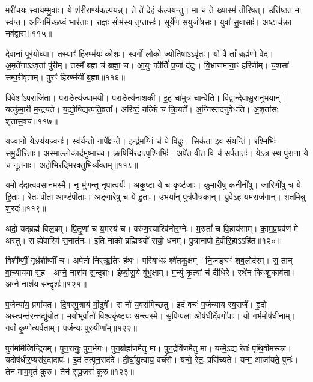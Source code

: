 मरी॑चयः स्वायम्भु॒वाः। ये श॑री॒राण्य॑कल्पयन्न्। 
ते ते॑ दे॒हं क॑ल्पयन्तु। मा च॑ ते॒ ख्यास्म॑ तीरिषत्। 
उत्ति॑ष्ठत॒ मा स्व॑प्त। अ॒ग्निमि॑च्छध्वं॒ भार॑ताः। 
राज्ञः॒ सोम॑स्य तृ॒प्तासः॑। सूर्ये॑ण स॒युजो॑षसः। 
युवा॑ सु॒वासाः᳚। अ॒ष्टाच॑क्रा॒ नव॑द्वारा॥११५॥


दे॒वानां॒ पूर॑यो॒ध्या। तस्याꣳ॑ हिरण्म॑यः को॒शः। 
स्व॒र्गो लो॒को ज्योति॒षाऽऽवृ॑तः। यो वै तां᳚ ब्रह्म॑णो वे॒द। 
अ॒मृते॑नाऽऽवृ॒तां पु॑रीम्। तस्मै᳚ ब्रह्म च॑ ब्रह्मा॒ च। 
आ॒युः कीर्तिं॑ प्र॒जां द॑दुः। वि॒भ्राज॑माना॒ꣳ॒ हरि॑णीम्। 
य॒शसा॑ सम्प॒रीवृ॑ताम्। पुरꣳ॑ हिरण्म॑यीं ब्र॒ह्मा॥११६॥


वि॒वेशा॑ऽप॒राजि॑ता। पराङेत्य॑ज्याम॒यी। 
पराङेत्य॑नाश॒की। इ॒ह चा॑मुत्र॑ चान्वे॒ति। 
वि॒द्वान्दे॑वासु॒रानु॑भ॒यान्। यत्कु॑मा॒री म॒न्द्रय॑ते। 
य॒द्यो॒षिद्यत्प॑ति॒व्रता᳚। अरि॑ष्टं॒ यत्किं च॑ क्रि॒यते᳚। 
अ॒ग्निस्तदनु॑वेधति। अ॒शृता॑सः शृ॑तास॒श्च॥११७॥


य॒ज्वानो॒ येऽप्य॑य॒ज्वनः॑। स्व॑र्यन्तो॒ नापे᳚क्षन्ते। 
इन्द्र॑म॒ग्निं च॑ ये वि॒दुः। सिक॑ता इव सं॒यन्ति॑। 
र॒श्मिभिः॑ समु॒दीरि॑ताः। अ॒स्माल्लो॒काद॑मुष्मा॒च्च। 
ऋ॒षिभि॑रदात्पृ॒श्निभिः॑। 
अपे॑त॒ वीत॒ वि च॑ सर्प॒तातः॑। येऽत्र॒ स्थ पु॑रा॒णा ये च॒ नूत॑नाः। 
अहो॑भिर॒द्भिर॒क्तु\-भि॒र्व्य॑क्तम्॥११८॥


य॒मो द॑दात्वव॒सान॑मस्मै। नृ मु॑णन्तु नृपा॒त्वर्यः॑। 
अ॒कृ॒ष्टा ये च॒ कृष्ट॑जाः। कु॒मारी॑षु क॒नीनी॑षु। 
जा॒रिणी॑षु च॒ ये हि॒ताः। रेतः॑ पीता॒ आण्ड॑पीताः। 
अङ्गा॑रेषु च॒ ये हु॒ताः। उ॒भया᳚न्‌ पुत्र॑पौत्र॒कान्। 
यु॒वे॒ऽहं य॒मराज॑गान्। श॒तमिन्नु श॒रदः॑॥११९॥


अदो॒ यद्ब्रह्म॑ विल॒बम्। पि॒तृ॒णां च॑ य॒मस्य॑ च। 
वरु॑ण॒स्याश्वि॑नोर॒ग्नेः। म॒रुतां᳚ च वि॒हाय॑साम्। 
का॒म॒प्र॒यव॑णं मे अस्तु। स ह्ये॑वास्मि॑ स॒नात॑नः। 
इति नाको ब्रह्मिश्रवो॑ रायो॒ धनम्। पु॒त्रानापो॑ दे॒वीरि॒हाऽऽहि॑त॥१२०॥\anuvakamend


विशी᳚र्ष्णीं॒ गृध्र॑शीर्ष्णीं च। अपेतो॑ निर्‌ऋ॒तिꣳ ह॑थः। 
परिबाधꣴ श्वे॑तकु॒क्षम्। नि॒जङ्घꣳ॑ शब॒लोद॑रम्। 
स॒ तान्‌ वा॒च्याय॑या स॒ह। अग्ने॒ नाश॑य स॒न्दृशः॑। 
ई॒र्ष्या॒सू॒ये बु॑भु॒क्षाम्। म॒न्युं कृ॒त्यां च॑ दीधिरे। 
रथे॑न किꣳशु॒काव॑ता। अग्ने॒ नाश॑य स॒न्दृशः॑॥१२१॥\anuvakamend


प॒र्जन्या॑य॒ प्रगा॑यत। दि॒वस्पु॒त्राय॑ मी॒ढुषे᳚। 
स नो॑ य॒वस॑मिच्छतु। इ॒दं वचः॑ प॒र्जन्या॑य स्व॒राजे᳚। 
हृ॒दो अ॒स्त्वन्त॑र॒न्तद्यु॑योत। म॒यो॒भूर्वातो॑ वि॒श्वकृ॑ष्टयः सन्त्व॒स्मे। 
सु॒पि॒प्प॒ला ओष॑धीर्दे॒वगो॑पाः। यो गर्भ॒मोष॑धीनाम्। 
गवां᳚ कृ॒णोत्यर्व॑ताम्। प॒र्जन्यः॑ पुरु॒षीणा᳚म्॥१२२॥\anuvakamend


पुन॑र्मामैत्विन्द्रि॒यम्। पुन॒रायुः॒ पुन॒र्भगः॑। 
पुन॒र्ब्राह्म॑णमैतु मा। पुन॒र्द्रवि॑णमैतु मा। 
यन्मे॒ऽद्य रेतः॑ पृथि॒वीमस्का\sn{}। यदोष॑धीर॒प्यस॑र॒द्यदापः॑। 
इ॒दं तत्पुन॒राद॑दे। दी॒र्घा॒यु॒त्वाय॒ वर्च॑से। 
यन्मे॒ रेतः॒ प्रसि॑च्यते। यन्म॒ आजा॑यते॒ पुनः॑। 
तेन॑ माम॒मृतं॑ कुरु। तेन॑ सुप्र॒जसं॑ कुरु॥१२३॥\anuvakamend


